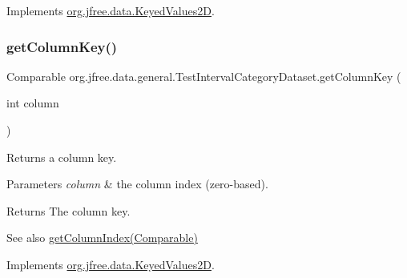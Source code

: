 Implements \mbox{\hyperlink{interfaceorg_1_1jfree_1_1data_1_1_keyed_values2_d_a3360f2f612f16e8c90409d65e3992d38}{org.\+jfree.\+data.\+Keyed\+Values2D}}.

\mbox{\label{classorg_1_1jfree_1_1data_1_1general_1_1_test_interval_category_dataset_a55b29571a2a0e450010e23a8ce7ad872}} 
\subsubsection{\texorpdfstring{get\+Column\+Key()}{getColumnKey()}}
{\footnotesize\ttfamily Comparable org.\+jfree.\+data.\+general.\+Test\+Interval\+Category\+Dataset.\+get\+Column\+Key (\begin{DoxyParamCaption}\item[{int}]{column }\end{DoxyParamCaption})}

Returns a column key.


\begin{DoxyParams}{Parameters}
{\em column} & the column index (zero-\/based).\\
\hline
\end{DoxyParams}
\begin{DoxyReturn}{Returns}
The column key.
\end{DoxyReturn}
\begin{DoxySeeAlso}{See also}
\mbox{\hyperlink{classorg_1_1jfree_1_1data_1_1general_1_1_test_interval_category_dataset_a90dc04f1966adbcc80f505554c8afd40}{get\+Column\+Index(\+Comparable)}} 
\end{DoxySeeAlso}


Implements \mbox{\hyperlink{interfaceorg_1_1jfree_1_1data_1_1_keyed_values2_d_a9ced6cbaf04f048db059e1ebf5184d2a}{org.\+jfree.\+data.\+Keyed\+Values2D}}.

\mbox{\label{classorg_1_1jfree_1_1data_1_1general_1_1_test_interval_category_dataset_a1b13db9fa7117272e3772074064ee5f2}} 
